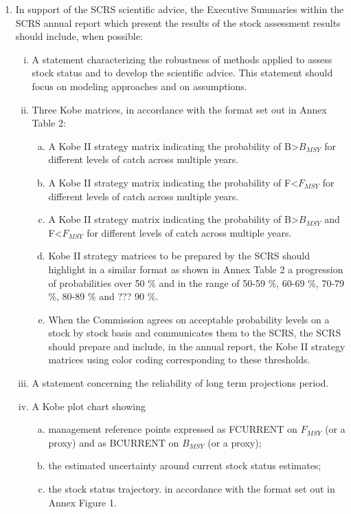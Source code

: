   \begin{enumerate}
    \item  In support of the SCRS scientific advice, the Executive Summaries within the SCRS annual report which present the results of the stock assessment results should include, when possible: 
    \begin{enumerate}[i)]
      \item A statement characterizing the robustness of methods applied to assess stock status and to develop the scientific advice. This statement should focus on modeling approaches and on assumptions.
      \item Three Kobe matrices, in accordance with the format set out in Annex Table 2:
	\begin{enumerate}[(a)]
         \item A Kobe II strategy matrix indicating the probability of B>$B_{MSY}$ for different levels of catch across multiple years.
         \item A Kobe II strategy matrix indicating the probability of F<$F_{MSY}$ for different levels of catch across multiple years.
         \item A Kobe II strategy matrix indicating the probability of B>$B_{MSY}$ and F<$F_{MSY}$ for different levels of catch across multiple years.
         \item Kobe II strategy matrices to be prepared by the SCRS should highlight in a similar format as shown in Annex Table 2 a progression 
                 of probabilities over 50 \% and in the range of 50-59 \%, 60-69 \%, 70-79 \%, 80-89 \% and ??? 90 \%. 
         \item When the Commission agrees on acceptable probability levels on a stock by stock basis and communicates them to the SCRS, 
                 the SCRS should prepare and include, in the annual report, the  Kobe II strategy matrices using color coding corresponding to these thresholds.
      \end{enumerate}

      \item  A statement concerning the reliability of long term projections period.
      \item   A Kobe plot chart showing
      \begin{enumerate}[(a)]
        \item management reference points expressed as FCURRENT on $F_{MSY}$ (or a proxy) and as BCURRENT on $B_{MSY}$ (or a proxy);
        \item the estimated uncertainty around current stock status estimates;
        \item the stock status trajectory. in accordance with the format set out in Annex Figure 1.
      \end{enumerate}


\end{enumerate}
\end{enumerate}
